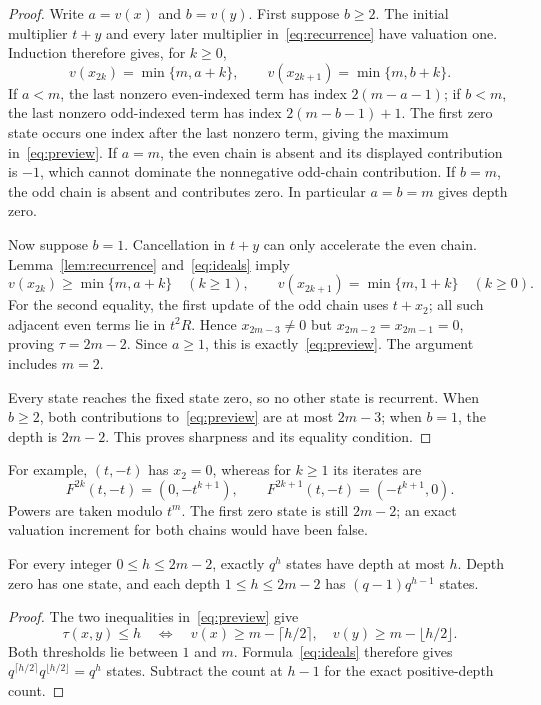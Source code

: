 \begin{proof}
Write $a=v(x)$ and $b=v(y)$. First suppose $b\geq2$. The initial
multiplier $t+y$ and every later multiplier in~\eqref{eq:recurrence}
have valuation one. Induction therefore gives, for $k\geq0$,
\begin{equation}
 v(x_{2k})=\min\{m,a+k\},\qquad
 v(x_{2k+1})=\min\{m,b+k\}.
 \label{eq:exactchains}
\end{equation}
If $a<m$, the last nonzero even-indexed term has index $2(m-a-1)$;
if $b<m$, the last nonzero odd-indexed term has index $2(m-b-1)+1$.
The first zero state occurs one index after the last nonzero term, giving
the maximum in~\eqref{eq:preview}. If $a=m$, the even chain is absent and
its displayed contribution is $-1$, which cannot dominate the nonnegative
odd-chain contribution. If $b=m$, the odd chain is absent and contributes
zero. In particular $a=b=m$ gives depth zero.

Now suppose $b=1$. Cancellation in $t+y$ can only accelerate the even
chain. Lemma~\ref{lem:recurrence} and~\eqref{eq:ideals} imply
\begin{equation}
 v(x_{2k})\geq\min\{m,a+k\}\quad(k\geq1),\qquad
 v(x_{2k+1})=\min\{m,1+k\}\quad(k\geq0).
 \label{eq:cancellationchains}
\end{equation}
For the second equality, the first update of the odd chain uses $t+x_2$;
all such adjacent even terms lie in $t^2R$. Hence $x_{2m-3}\ne0$ but
$x_{2m-2}=x_{2m-1}=0$, proving $\tau=2m-2$. Since $a\geq1$, this is
exactly~\eqref{eq:preview}. The argument includes $m=2$.

Every state reaches the fixed state zero, so no other state is recurrent.
When $b\geq2$, both contributions to~\eqref{eq:preview} are at most
$2m-3$; when $b=1$, the depth is $2m-2$. This proves sharpness and its
equality condition.
\end{proof}

For example, $(t,-t)$ has $x_2=0$, whereas for $k\geq1$ its iterates are
\begin{equation}
 F^{2k}(t,-t)=(0,-t^{k+1}),\qquad
 F^{2k+1}(t,-t)=(-t^{k+1},0).
 \label{eq:example}
\end{equation}
Powers are taken modulo $t^m$. The first zero state is still $2m-2$;
an exact valuation increment for both chains would have been false.

\begin{corollary}
\label{cor:depth}
For every integer $0\leq h\leq2m-2$, exactly $q^h$ states have depth at
most $h$. Depth zero has one state, and each depth $1\leq h\leq2m-2$ has
$(q-1)q^{h-1}$ states.
\end{corollary}

\begin{proof}
The two inequalities in~\eqref{eq:preview} give
\[
 \tau(x,y)\leq h\quad\Longleftrightarrow\quad
 v(x)\geq m-\lceil h/2\rceil,\quad
 v(y)\geq m-\lfloor h/2\rfloor.
\]
Both thresholds lie between $1$ and $m$. Formula~\eqref{eq:ideals}
therefore gives $q^{\lceil h/2\rceil}q^{\lfloor h/2\rfloor}=q^h$
states. Subtract the count at $h-1$ for the exact positive-depth count.
\end{proof}
